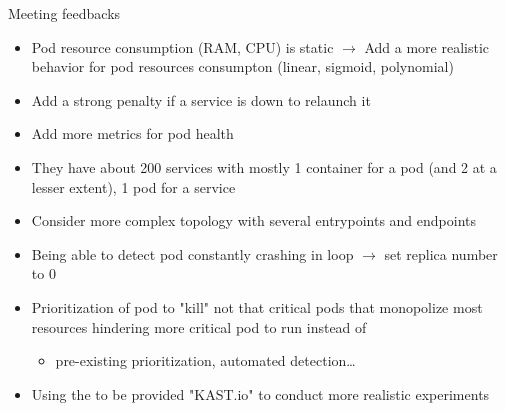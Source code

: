 \documentclass{beamer}
\begin{document}
\begin{frame}[allowframebreaks]{Meeting feedbacks}
    \begin{itemize}
        \item Pod resource consumption (RAM, CPU) is static $\rightarrow$ Add a more realistic behavior for pod resources consumpton (linear, sigmoid, polynomial)
        \item Add a strong penalty if a service is down to relaunch it
        \item Add more metrics for pod health
        \item They have about 200 services with mostly 1 container for a pod (and 2 at a lesser extent), 1 pod for a service
        \item Consider more complex topology with several entrypoints and endpoints
        \item Being able to detect pod constantly crashing in loop $\rightarrow$ set replica number to 0
        \item Prioritization of pod to "kill" not that critical pods that monopolize most resources hindering more critical pod to run instead of
        \begin{itemize}
            \item pre-existing prioritization, automated detection\dots
        \end{itemize}
        \item Using the to be provided "KAST.io" to conduct more realistic experiments
    \end{itemize}
\end{frame}
\end{document}
